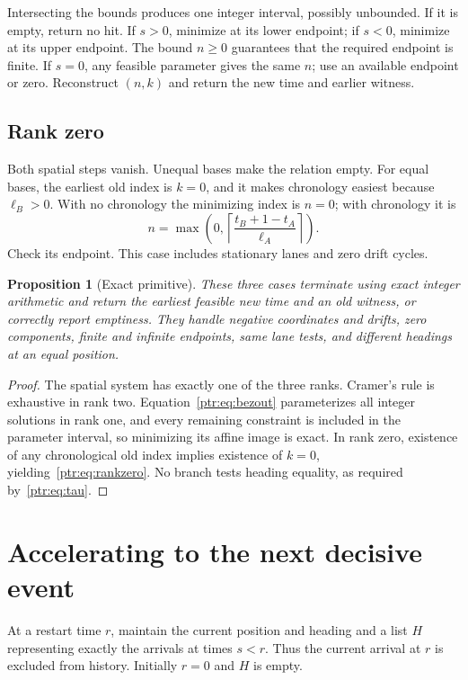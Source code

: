 \documentclass[11pt,letterpaper]{article}
\newtheorem{proposition}[theorem]{Proposition}
\theoremstyle{definition}\newtheorem{definition}[theorem]{Definition}
\theoremstyle{remark}\newtheorem{remark}[theorem]{Remark}
\begin{document}
Intersecting the bounds produces one integer interval, possibly unbounded. If it is empty, return no hit. If $s>0$, minimize at its lower endpoint; if $s<0$, minimize at its upper endpoint. The bound $n\ge0$ guarantees that the required endpoint is finite. If $s=0$, any feasible parameter gives the same $n$; use an available endpoint or zero. Reconstruct $(n,k)$ and return the new time and earlier witness.

\subsection{Rank zero}
Both spatial steps vanish. Unequal bases make the relation empty. For equal bases, the earliest old index is $k=0$, and it makes chronology easiest because $\ell_B>0$. With no chronology the minimizing index is $n=0$; with chronology it is
\begin{equation}\label{ptr:eq:rankzero}
 n=\max\left(0,\left\lceil\frac{t_B+1-t_A}{\ell_A}\right\rceil\right).
\end{equation}
Check its endpoint. This case includes stationary lanes and zero drift cycles.

\begin{proposition}[Exact primitive]\label{ptr:prop:primitive}
These three cases terminate using exact integer arithmetic and return the earliest feasible new time and an old witness, or correctly report emptiness. They handle negative coordinates and drifts, zero components, finite and infinite endpoints, same lane tests, and different headings at an equal position.
\end{proposition}
\begin{proof}
The spatial system has exactly one of the three ranks. Cramer's rule is exhaustive in rank two. Equation~\eqref{ptr:eq:bezout} parameterizes all integer solutions in rank one, and every remaining constraint is included in the parameter interval, so minimizing its affine image is exact. In rank zero, existence of any chronological old index implies existence of $k=0$, yielding~\eqref{ptr:eq:rankzero}. No branch tests heading equality, as required by~\eqref{ptr:eq:tau}.
\end{proof}

\section{Accelerating to the next decisive event}\label{ptr:sec:algorithm}
At a restart time $r$, maintain the current position and heading and a list $H$ representing exactly the arrivals at times $s<r$. Thus the current arrival at $r$ is excluded from history. Initially $r=0$ and $H$ is empty.
\end{document}
